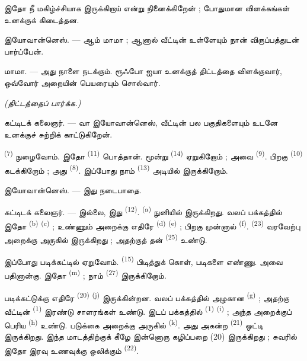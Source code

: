 இதோ நீ மகிழ்ச்சியாக இருக்கிறாய் என்று நினைக்கிறேன் ; போதுமான
விளக்கங்கள் உனக்குக் கிடைத்தன.

\textsc{இயோவான்னெஸ்}. --- ஆம் மாமா ; ஆனால் வீட்டின் உள்ளேயும் நான்
விருப்பத்துடன் பார்ப்பேன்.

\textsc{மாமா}. --- அது நாளை நடக்கும். ரூஃபோ ஐயா உனக்குத் திட்டத்தை
விளக்குவார், ஒவ்வோர் அறையின் பெயரையும் சொல்வார்.

\VUsaut{3.0mm}
\VUsaut{2.4mm}

{\centering\textit{(திட்டத்தைப் பார்க்க.)}\par}
\VUsaut{2.4mm}

\textsc{கட்டிடக் கலைஞர்}. --- வா இயோவான்னெஸ், வீட்டின் பல பகுதிகளையும்
உடனே உனக்குச் சுற்றிக் காட்டுகிறேன்.

 \textsuperscript{(7)} நுழைவோம். இதோ
 \textsuperscript{(11)} பொத்தான். மூன்று 
\textsuperscript{(14)} ஏறுகிறோம் ; அவை 
\textsuperscript{(9)}. பிறகு  \textsuperscript{(10)}
கடக்கிறோம் ; அது  \textsuperscript{(8)}.
இப்போது நாம்  \textsuperscript{(13)} அடியில்
இருக்கிறோம்.

\textsc{இயோவான்னெஸ்}. --- இது நடைபாதை.

\textsc{கட்டிடக் கலைஞர்}. --- இல்லை, இது 
\textsuperscript{(12)}.  \textsuperscript{(a)} நுனியில்
இருக்கிறது. வலப் பக்கத்தில் இதோ 
\textsuperscript{(b)}  \textsuperscript{(c)} ;
உண்ணும் அறைக்கு எதிரே  \textsuperscript{(d)}
 \textsuperscript{(e)} ; பிறகு முன்னால்
 \textsuperscript{(f)}. 
\textsuperscript{(23)} வரவேற்பு அறைக்கு அருகில் இருக்கிறது ; அதற்குத் தன்
 \textsuperscript{(25)} உண்டு.

இப்போது படிக்கட்டில் ஏறுவோம்.  \textsuperscript{(15)}
பிடித்துக் கொள், படிகளை எண்ணு. அவை பதினான்கு. இதோ 
\textsuperscript{(m)} ; நாம்  \textsuperscript{(27)}
இருக்கிறோம்.

\VUsaut{3.0mm}
\VUsaut{3.0mm}

படிக்கட்டுக்கு எதிரே  \textsuperscript{(20)}
 \textsuperscript{(j)} இருக்கின்றன. வலப் பக்கத்தில்
அழகான  \textsuperscript{(g)} ; அதற்கு வீட்டின்
 \textsuperscript{(1)} இரண்டு சாளரங்கள் உண்டு. இடப்
பக்கத்தில்  \textsuperscript{(1)}
 \textsuperscript{(i)} ; அந்த அறைக்குப் பெரிய
 \textsuperscript{(h)} உண்டு. படுக்கை அறைக்கு அருகில்
 \textsuperscript{(k)}. அது அகன்ற
 \textsuperscript{(21)} ஒட்டி இருக்கிறது. இந்த
மாடத்திற்குக் கீழே இன்னொரு கழிப்பறை (20) இருக்கிறது ; சுவரில் இதோ
இரவு உணவுக்கு ஒலிக்கும்  \textsuperscript{(22)}.

